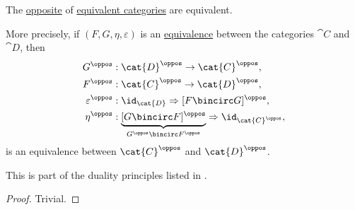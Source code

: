 \begin{proposition}\label{thm:opposite_of_category_equivalence}
  The \hyperref[def:opposite_category]{opposite} of \hyperref[def:category_equivalence]{equivalent categories} are equivalent.

  More precisely, if \( (F, G, \eta, \varepsilon) \) is an \hyperref[def:category_equivalence]{equivalence} between the categories \( \cat{C} \) and \( \cat{D} \), then
  \begin{equation*}
    \begin{aligned}
                G^\oppos &: \cat{D}^\oppos \to \cat{C}^\oppos, \\
                F^\oppos &: \cat{C}^\oppos \to \cat{D}^\oppos, \\
      \varepsilon^\oppos &: \id_{\cat{D}} \Rightarrow [F \bincirc G]^\oppos, \\
             \eta^\oppos &: \underbrace{[G \bincirc F]^\oppos}_{G^\oppos \bincirc F^\oppos} \Rightarrow \id_{\cat{C}^\oppos},
    \end{aligned}
  \end{equation*}
  is an equivalence between \( \cat{C}^\oppos \) and \( \cat{D}^\oppos \).

  This is part of the duality principles listed in .
\end{proposition}
\begin{proof}
  Trivial.
\end{proof}

